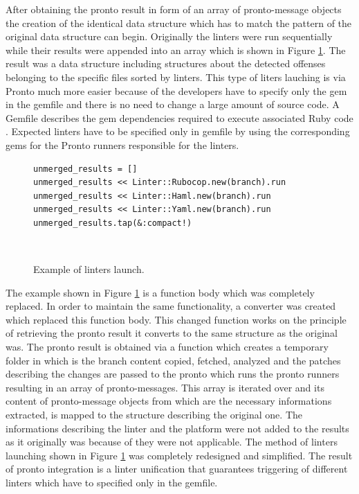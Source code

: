 After obtaining the pronto result in form of an array of pronto-message objects the creation of the identical data structure which has to match the pattern of the original data structure can begin. Originally the linters were run sequentially while their results were appended into an array which is shown in Figure \ref{fig:run_all_linters}. The result was a data structure including structures about the detected offenses belonging to the specific files sorted by linters. This type of liters lauching is via Pronto much more easier because of the developers have to specify only the gem in the gemfile and there is no need to change a large amount of source code. A Gemfile describes the gem dependencies required to execute associated Ruby code \cite{Gemfile}. Expected linters have to be specified only in gemfile by using the corresponding gems for the Pronto runners responsible for the linters.

\begin{figure}[H]
\begin{lstlisting}[basicstyle=\scriptsize, xleftmargin=.27\textwidth]
unmerged_results = []
unmerged_results << Linter::Rubocop.new(branch).run
unmerged_results << Linter::Haml.new(branch).run
unmerged_results << Linter::Yaml.new(branch).run
unmerged_results.tap(&:compact!)
\end{lstlisting}
\hfill\\[-3em]
\caption{Example of linters launch.}
\label{fig:run_all_linters}
\end{figure}

The example shown in Figure \ref{fig:run_all_linters} is a function body which was completely replaced. In order to maintain the same functionality, a converter was created which replaced this function body. This changed function works on the principle of retrieving the pronto result it converts to the same structure as the original was. The pronto result is obtained via a function which creates a temporary folder in which is the branch content copied, fetched, analyzed and the patches describing the changes are passed to the pronto which runs the pronto runners resulting in an array of pronto-messages. This array is iterated over and its content of pronto-message objects from which are the necessary informations extracted, is mapped to the structure describing the original one. The informations describing the linter and the platform were not added to the results as it originally was because of they were not applicable. The method of linters launching shown in Figure \ref{fig:run_all_linters} was completely redesigned and simplified. The result of pronto integration is a linter unification that guarantees triggering of different linters which have to specified only in the gemfile.\\

